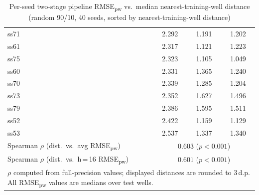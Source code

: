 \begin{table}[htbp]
{\begin{tabular}{lccc}
ss71 & 2.292 & 1.191 & 1.202 \\
ss61 & 2.317 & 1.121 & 1.223 \\
ss75 & 2.323 & 1.105 & 1.049 \\
ss60 & 2.331 & 1.365 & 1.240 \\
ss70 & 2.339 & 1.285 & 1.204 \\
ss73 & 2.352 & 1.627 & 1.496 \\
ss79 & 2.386 & 1.595 & 1.511 \\
ss52 & 2.422 & 1.159 & 1.129 \\
ss53 & 2.537 & 1.337 & 1.340 \\
\midrule
Spearman $\rho$ (dist.\ vs.\ avg RMSE\textsubscript{pw}) & \multicolumn{3}{c}{$0.603$ ($p < 0.001$)} \\
Spearman $\rho$ (dist.\ vs.\ h\,=\,16 RMSE\textsubscript{pw}) & \multicolumn{3}{c}{$0.601$ ($p < 0.001$)} \\
\bottomrule
\multicolumn{4}{l}{\footnotesize $\rho$ computed from full-precision values; displayed distances are rounded to 3\,d.p. All RMSE\textsubscript{pw} values are medians over test wells.} \\
\end{tabular}}
\caption{Per-seed two-stage pipeline RMSE\textsubscript{pw} vs.\ median nearest-training-well distance (random 90/10, 40 seeds, sorted by nearest-training-well distance)}
\label{tab:seed_distance}
\end{table}

\begin{table}[htbp]
\centering
{}
\caption{Two-stage vs.\ jointly trained by NTN distance decile}
\label{tab:decile_comparison}
\end{table}



